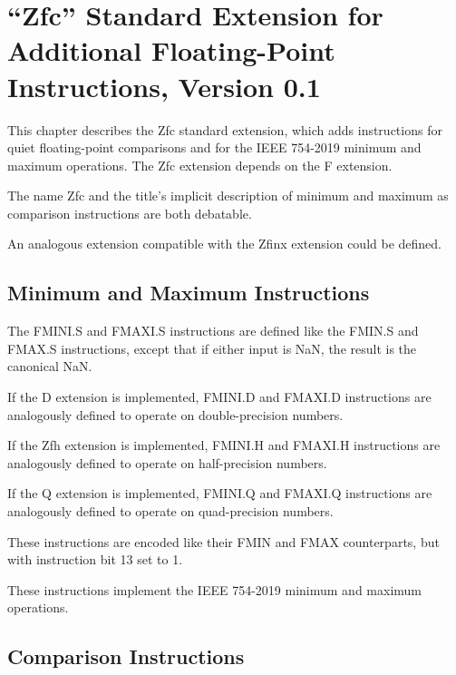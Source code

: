 \chapter{``Zfc'' Standard Extension for Additional Floating-Point
Instructions, Version 0.1}
\label{sec:zfc}

This chapter describes the Zfc standard extension, which adds instructions for
quiet floating-point comparisons and for the IEEE 754-2019 minimum and maximum
operations.
The Zfc extension depends on the F extension.

\begin{commentary}
The name Zfc and the title's implicit description of minimum and maximum as
comparison instructions are both debatable.
\end{commentary}

\begin{commentary}
An analogous extension compatible with the Zfinx extension could be defined.
\end{commentary}

\section{Minimum and Maximum Instructions}

The FMINI.S and FMAXI.S instructions are defined like the FMIN.S and FMAX.S
instructions, except that if either input is NaN, the result is the
canonical NaN.

If the D extension is implemented, FMINI.D and FMAXI.D instructions are
analogously defined to operate on double-precision numbers.

If the Zfh extension is implemented, FMINI.H and FMAXI.H instructions are
analogously defined to operate on half-precision numbers.

If the Q extension is implemented, FMINI.Q and FMAXI.Q instructions are
analogously defined to operate on quad-precision numbers.

These instructions are encoded like their FMIN and FMAX counterparts, but
with instruction bit 13 set to 1.

\begin{commentary}
These instructions implement the IEEE 754-2019 minimum and maximum operations.
\end{commentary}


\section{Comparison Instructions}

